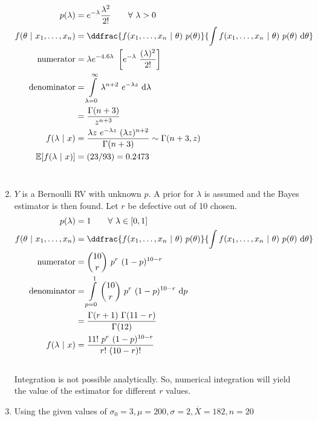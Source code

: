 \begin{enumerate}
		\begin{align}
			p(\lambda) &= e^{-\lambda} \frac{\lambda^2}{2!}\qquad \forall\ \lambda > 0 \nonumber \\
			f(\theta\ |\ x_1, \dots, x_n) &= \ddfrac{f(x_1, \dots, x_n\ |\ \theta)\ p(\theta)}{\int\limits f(x_1, \dots, x_n\ |\ \theta)\ p(\theta)\  \mathrm{d}\theta} \\
			\text{numerator}&= \lambda e^{-4.6\lambda }\ \left[e^{-\lambda}\ \dfrac{(\lambda)^{2}}{2!}\right] \nonumber \\
			\text{denominator}&= \int\limits_{\lambda=0}^{\infty} \lambda^{n+2}\ e^{-\lambda z}\ \mathrm{d}\lambda \nonumber \\
			&= \frac{\Gamma(n+3)}{z^{n+3}}\nonumber \\
			f(\lambda\ |\ x) &= \frac{\lambda z\ e^{-\lambda z}\ (\lambda z)^{n+2}}{\Gamma(n+3)} \sim \Gamma(n+3, z) \\
			\mathbb{E}[f(\lambda\ |\ x)] &= (23/93) = 0.2473
		\end{align}\\
	
	
	\item $ Y $ is a Bernoulli RV with unknown $ p $. A prior for $ \lambda $ is assumed and the Bayes estimator is then found. Let $ r $ be defective out of 10 chosen.\\
	
		\begin{align}
			p(\lambda) &= 1\qquad \forall\ \lambda \in [0, 1] \nonumber \\
			f(\theta\ |\ x_1, \dots, x_n) &= \ddfrac{f(x_1, \dots, x_n\ |\ \theta)\ p(\theta)}{\int\limits f(x_1, \dots, x_n\ |\ \theta)\ p(\theta)\  \mathrm{d}\theta} \\
			\text{numerator}&= \binom{10}{r}\ p^r\ (1-p)^{10-r} \nonumber \\
			\text{denominator}&= \int\limits_{p=0}^{1} \binom{10}{r}\ p^r\ (1-p)^{10-r}\ \mathrm{d}p \nonumber \\
			&= \frac{\Gamma(r+1)\ \Gamma(11-r)}{\Gamma(12)}\nonumber \\
			f(\lambda\ |\ x) &= \frac{11!\ p^r\ (1-p)^{10-r}}{r!\ (10-r)!}
		\end{align}\\
		Integration is not possible analytically. So, numerical integration will yield the value of the estimator for different $ r $ values. \\
	
	
	\item Using the given values of $ \sigma_0 = 3, \mu = 200, \sigma = 2, \overline{X} = 182, n = 20 $
	

\end{enumerate}
